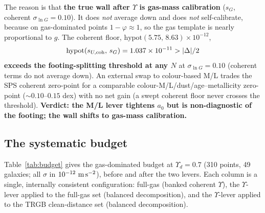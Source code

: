 \documentclass[fleqn,usenatbib]{mnras}
\begin{document}
The reason is that \textbf{the true wall after $\Upsilon$ is gas-mass calibration} ($s_G$, coherent $\sigma_{\ln G}=0.10$). It does \emph{not} average down and does \emph{not} self-calibrate, because on gas-dominated points $1-\varphi\approx1$, so the gas template is nearly proportional to $g$. The coherent floor, $\mathrm{hypot}(5.75,\,8.63)\times10^{-12}$,
\begin{equation}
\mathrm{hypot}(s_{U,\rm coh},\,s_G)=1.037\times10^{-11}>|\Delta|/2
\label{eq:floor}
\end{equation}
\textbf{exceeds the footing-splitting threshold at any $N$} at $\sigma_{\ln G}=0.10$ (coherent terms do not average down). An external swap to colour-based M/L \citep{McGaughSchombert2014} trades the SPS coherent zero-point for a comparable colour-M/L/dust/age--metallicity zero-point (${\sim}0.10$--$0.15$ dex) with no net gain (a swept coherent floor never crosses the threshold). \textbf{Verdict: the M/L lever tightens $a_0$ but is non-diagnostic of the footing; the wall shifts to gas-mass calibration.}

\subsection{The systematic budget}
\label{sec:budget}

Table~\ref{tab:budget} gives the gas-dominated budget at $\Upsilon_d=0.7$ (310 points, 49 galaxies; all $\sigma$ in $10^{-12}\ {\rm m\,s^{-2}}$), before and after the two levers. Each column is a single, internally consistent configuration: full-gas (banked coherent $\Upsilon$), the $\Upsilon$-lever applied to the full-gas set (balanced decomposition), and the $\Upsilon$-lever applied to the TRGB clean-distance set (balanced decomposition).
\end{document}
